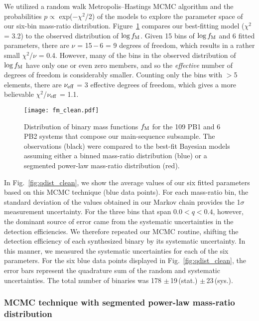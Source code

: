 \documentclass[a4paper,fleqn,usenatbib]{mnras}
\begin{document}
We utilized a random walk Metropolis--Hastings MCMC algorithm and the probabilities $p \propto$ exp($-\chi^2$/2) of the models to explore the parameter space of our six-bin mass-ratio distribution. Figure~\ref{fig:fm_clean} compares our best-fitting model ($\chi^2$ = 3.2) to the observed distribution of $\log f_{\rm M}$. Given 15 bins of $\log f_{\rm M}$ and 6 fitted parameters, there are $\nu$ = 15\,$-$\,6 = 9 degrees of freedom, which results in a rather small $\chi^2$/$\nu$ = 0.4. However, many of the bins in the observed distribution of $\log f_{\rm M}$ have only one or even zero members, and so the {\it effective} number of degrees of freedom is considerably smaller.  Counting only the bins with $>$5 elements, there are $\nu_{\rm eff}$ = 3 effective degrees of freedom, which gives a more believable $\chi^2$/$\nu_{\rm eff}$ = 1.1.

\begin{figure}
\begin{center}
\texttt{[image: fm\_clean.pdf]}
\caption{Distribution of binary mass functions $f_{\rm M}$ for the 109 PB1 and 6 PB2 systems that compose our main-sequence subsample. The observations (black) were compared to the best-fit Bayesian models assuming either a binned mass-ratio distribution (blue) or a segmented power-law mass-ratio distribution (red).}
\label{fig:fm_clean}
\end{center}
\end{figure}


In Fig.~\ref{fig:qdist_clean}, we show the average values of our six fitted parameters based on this MCMC technique (blue data points). For each mass-ratio bin, the standard deviation of the values obtained in our Markov chain provides the 1$\sigma$ measurement uncertainty. For the three bins that span $0.0 < q < 0.4$, however, the dominant source of error came from the systematic uncertainties in the detection efficiencies. We therefore repeated our MCMC routine, shifting the detection efficiency of each synthesized binary by its systematic uncertainty. In this manner, we measured the systematic uncertainties for each of the six parameters. For the six blue data points displayed in Fig.~\ref{fig:qdist_clean}, the error bars represent the quadrature sum of the random and systematic uncertainties. The total number of binaries was 178 $\pm$\,19\,(stat.) $\pm$\,23\,(sys.).


\subsubsection{MCMC technique with segmented power-law mass-ratio distribution} 
\label{sssec:MCMC_power}
\end{document}
